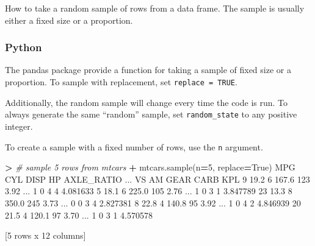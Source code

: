 \documentclass[
]{book}
\newenvironment{Shaded}{\begin{snugshade}}{\end{snugshade}}
\newcommand{\CommentTok}[1]{\textcolor[rgb]{0.56,0.35,0.01}{\textit{#1}}}
\newcommand{\DecValTok}[1]{\textcolor[rgb]{0.00,0.00,0.81}{#1}}
\newcommand{\FloatTok}[1]{\textcolor[rgb]{0.00,0.00,0.81}{#1}}
\newcommand{\NormalTok}[1]{#1}
\newcommand{\OperatorTok}[1]{\textcolor[rgb]{0.81,0.36,0.00}{\textbf{#1}}}
\newcommand{\VariableTok}[1]{\textcolor[rgb]{0.00,0.00,0.00}{#1}}
\begin{document}
How to take a random sample of rows from a data frame. The sample is usually either a fixed size or a proportion.

\hypertarget{python-29}{%
\subsubsection*{Python}\label{python-29}}

The pandas package provide a function for taking a sample of fixed size or a proportion. To sample with replacement, set \texttt{replace\ =\ TRUE}.

Additionally, the random sample will change every time the code is run. To always generate the same ``random'' sample, set \texttt{random\_state} to any positive integer.

To create a sample with a fixed number of rows, use the \texttt{n} argument.

\begin{Shaded}
\begin{Highlighting}[]
\OperatorTok{\textgreater{}} \CommentTok{\# sample 5 rows from mtcars}
\OperatorTok{+}\NormalTok{ mtcars.sample(n}\OperatorTok{=}\DecValTok{5}\NormalTok{, replace}\OperatorTok{=}\VariableTok{True}\NormalTok{)}
\NormalTok{     MPG  CYL   DISP   HP  AXLE\_RATIO  ...  VS  AM  GEAR CARB       KPL}
\DecValTok{9}   \FloatTok{19.2}    \DecValTok{6}  \FloatTok{167.6}  \DecValTok{123}        \FloatTok{3.92}\NormalTok{  ...   }\DecValTok{1}   \DecValTok{0}     \DecValTok{4}    \DecValTok{4}  \FloatTok{4.081633}
\DecValTok{5}   \FloatTok{18.1}    \DecValTok{6}  \FloatTok{225.0}  \DecValTok{105}        \FloatTok{2.76}\NormalTok{  ...   }\DecValTok{1}   \DecValTok{0}     \DecValTok{3}    \DecValTok{1}  \FloatTok{3.847789}
\DecValTok{23}  \FloatTok{13.3}    \DecValTok{8}  \FloatTok{350.0}  \DecValTok{245}        \FloatTok{3.73}\NormalTok{  ...   }\DecValTok{0}   \DecValTok{0}     \DecValTok{3}    \DecValTok{4}  \FloatTok{2.827381}
\DecValTok{8}   \FloatTok{22.8}    \DecValTok{4}  \FloatTok{140.8}   \DecValTok{95}        \FloatTok{3.92}\NormalTok{  ...   }\DecValTok{1}   \DecValTok{0}     \DecValTok{4}    \DecValTok{2}  \FloatTok{4.846939}
\DecValTok{20}  \FloatTok{21.5}    \DecValTok{4}  \FloatTok{120.1}   \DecValTok{97}        \FloatTok{3.70}\NormalTok{  ...   }\DecValTok{1}   \DecValTok{0}     \DecValTok{3}    \DecValTok{1}  \FloatTok{4.570578}

\NormalTok{[}\DecValTok{5}\NormalTok{ rows x }\DecValTok{12}\NormalTok{ columns]}
\end{Highlighting}
\end{Shaded}
\end{document}

